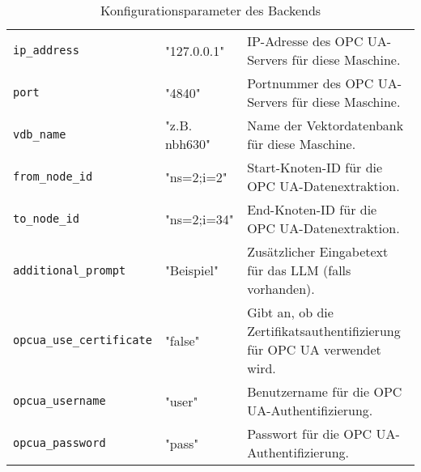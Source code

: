 \documentclass[%
	paper=a4,           %
	12pt,               %
	parskip=full,       %
	oneside,            %
	listof=totoc,		%
	bibliography=totoc,
	toc=listof,
	toc=chapterentrydotfill %
]{scrreprt}             %
\begin{document}
\begin{table}[H]
\begin{tabular}{p{3.5cm}p{2.5cm}p{10.5cm}}
        \texttt{ip\_address}             & "127.0.0.1"           & IP-Adresse des OPC UA-Servers für diese Maschine.                                   \\
        \texttt{port}                    & "4840"                & Portnummer des OPC UA-Servers für diese Maschine.                                   \\
        \texttt{vdb\_name}               & "z.B. nbh630"         & Name der Vektordatenbank für diese Maschine.                                        \\
        \texttt{from\_node\_id}          & "ns=2;i=2"            & Start-Knoten-ID für die OPC UA-Datenextraktion.                                     \\
        \texttt{to\_node\_id}            & "ns=2;i=34"           & End-Knoten-ID für die OPC UA-Datenextraktion.                                       \\
        \texttt{additional\_prompt}      & "Beispiel"            & Zusätzlicher Eingabetext für das LLM (falls vorhanden).                             \\
        \texttt{opcua\_use\_certificate} & "false"               & Gibt an, ob die Zertifikatsauthentifizierung für OPC UA verwendet wird.             \\
        \texttt{opcua\_username}         & "user"                & Benutzername für die OPC UA-Authentifizierung.                                      \\
        \texttt{opcua\_password}         & "pass"                & Passwort für die OPC UA-Authentifizierung.                                          \\
        \bottomrule
    \end{tabular}
    \caption{Konfigurationsparameter des Backends}
\end{table}
\end{document}
